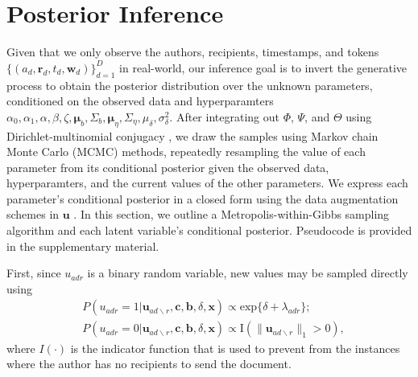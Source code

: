 \documentclass{article}
\begin{document}
\section{Posterior Inference}\label{sec:Inference}
Given that we only observe the authors, recipients, timestamps, and tokens $ \{ (a_d, \boldsymbol{r}_d, t_d,  \boldsymbol{w}_d)\}_{d=1}^D$ in real-world, our inference goal is to invert the generative process to obtain the posterior distribution over the unknown parameters, conditioned on the observed data and hyperparamters $\alpha_0, \alpha_1, \alpha, \beta, \zeta, \boldsymbol{\mu}_b, \Sigma_b, \boldsymbol{\mu}_\eta, \Sigma_\eta, {\mu}_\delta,\sigma^2_\delta$. After integrating out $\Phi$, $\Psi$, and $\Theta$ using Dirichlet-multinomial conjugacy \cite{griffiths2004finding}, we draw the samples using Markov chain Monte Carlo (MCMC) methods, repeatedly resampling the value of each parameter from its conditional posterior given the observed data, hyperparamters, and the current values of the other parameters. We express each parameter’s conditional posterior in a closed form using the data augmentation schemes in $\boldsymbol{u}$ \cite{tanner1987calculation}. In this section, we outline a Metropolis-within-Gibbs sampling algorithm and each latent variable's conditional posterior. Pseudocode is provided in the supplementary material.

First, since $u_{adr}$ is a binary random variable, new values may be sampled directly using
\begin{equation}
\begin{aligned}
&P(u_{adr}=1| \boldsymbol{u}_{ad\backslash r}, \boldsymbol{c},\boldsymbol{b}, \delta, \boldsymbol{x})
\propto \mbox{exp}\{\delta+\lambda_{adr}\};\\
&P(u_{adr}=0| \boldsymbol{u}_{ad\backslash r}, \boldsymbol{c},\boldsymbol{b}, \delta, \boldsymbol{x})\propto \text{I}(\lVert\boldsymbol{u}_{ad\backslash r}\rVert_1 > 0 ),
\end{aligned}
\label{eqn:latentreceiver}
\end{equation}
where $I(\cdot)$ is the indicator function that is used to prevent from the instances where the author has no recipients to send the document.
\end{document}
